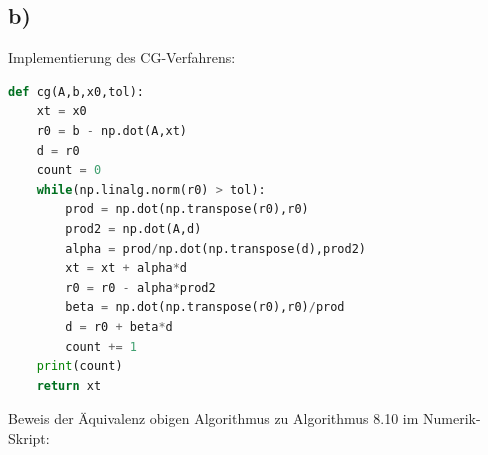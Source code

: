 \subsection*{b)}
Implementierung des CG-Verfahrens:
\begin{lstlisting}[language=Python]
def cg(A,b,x0,tol):
    xt = x0
    r0 = b - np.dot(A,xt)
    d = r0
    count = 0
    while(np.linalg.norm(r0) > tol):
        prod = np.dot(np.transpose(r0),r0)
        prod2 = np.dot(A,d)
        alpha = prod/np.dot(np.transpose(d),prod2)
        xt = xt + alpha*d
        r0 = r0 - alpha*prod2
        beta = np.dot(np.transpose(r0),r0)/prod
        d = r0 + beta*d
        count += 1
    print(count)
    return xt
\end{lstlisting}
Beweis der Äquivalenz obigen Algorithmus zu Algorithmus 8.10 im Numerik-Skript:
